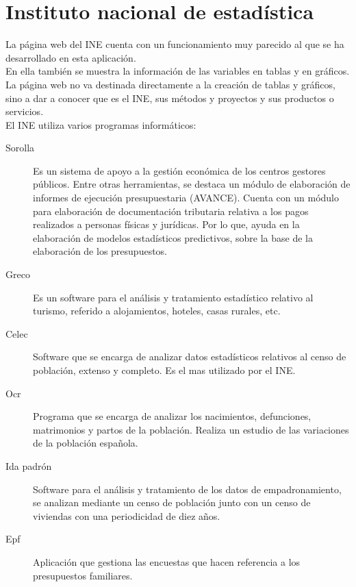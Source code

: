 \section{Instituto nacional de estadística}
La página web del INE cuenta con un funcionamiento muy parecido al que se ha desarrollado en esta aplicación.\\
En ella también se muestra la información de las variables en tablas y en gráficos.\\
La página web no va destinada directamente a la creación de tablas y gráficos, sino a dar a conocer que es el INE, sus métodos y proyectos y sus productos o servicios.\\
El INE utiliza varios programas informáticos:
\begin{description}
    \item [Sorolla] Es un sistema de apoyo a la gestión económica de los centros gestores públicos. Entre otras herramientas, se destaca un módulo de elaboración de informes de ejecución presupuestaria (AVANCE). Cuenta con un módulo para elaboración de documentación tributaria relativa a los pagos realizados a personas físicas y jurídicas. Por lo que, ayuda en la elaboración de modelos estadísticos predictivos, sobre la base de la elaboración de los presupuestos.
    \item [Greco] Es un software para el análisis y tratamiento estadístico relativo al turismo, referido a alojamientos, hoteles, casas rurales, etc.
    \item [Celec] Software que se encarga de analizar datos estadísticos relativos al censo de población, extenso y completo. Es el mas utilizado por el INE.
    \item [Ocr] Programa que se encarga de analizar los nacimientos, defunciones, matrimonios y partos de la población. Realiza un estudio de las variaciones de la población española.
    \item [Ida padrón] Software para el análisis y tratamiento de los datos de empadronamiento, se analizan mediante un censo de población junto con un censo de viviendas con una periodicidad de diez años.
    \item [Epf] Aplicación que gestiona las encuestas que hacen referencia a los presupuestos familiares.
\end{description}
